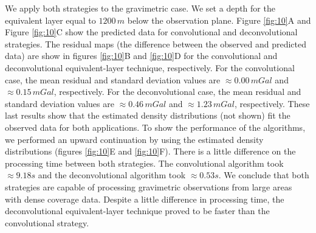 We apply both strategies to the gravimetric case. We set a depth for the equivalent layer equal to $1200 \, m$ below the observation plane. Figure \ref{fig:10}A and Figure \ref{fig:10}C show the predicted data for convolutional and deconvolutional strategies. The residual maps (the difference between the observed and predicted data) are show in figures \ref{fig:10}B and \ref{fig:10}D for the convolutional and deconvolutional equivalent-layer technique, respectively. For the convolutional case, the mean residual and standard deviation values are $\approx 0.00 \, mGal$ and $\approx 0.15 \, mGal$, respectively. For the deconvolutional case, the mean residual and standard deviation values are $\approx 0.46 \, mGal$ and $\approx 1.23 \, mGal$, respectively. These last results show that the estimated density distributions (not shown) fit the observed data for both applications. To show the performance of the algorithms, we performed an upward continuation by using the estimated density distributions (figures \ref{fig:10}E and \ref{fig:10}F). There is a little difference on the processing time between both strategies. The convolutional algorithm took $\approx 9.18 s$ and the deconvolutional algorithm took $\approx 0.53 s$. We conclude that both strategies are capable of processing gravimetric observations from large areas with dense coverage data. Despite a little difference in processing time, the deconvolutional equivalent-layer technique proved to be faster than the convolutional strategy.

